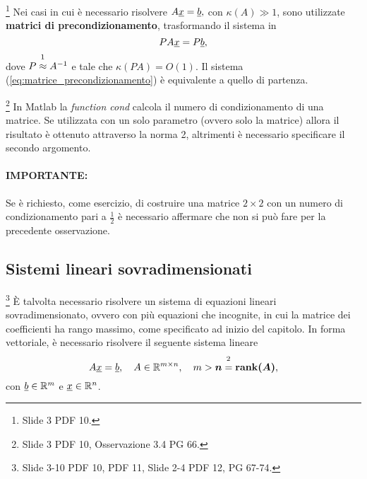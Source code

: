 \begin{remark}\footnote{Slide 3 PDF 10.}
    Nei casi in cui è necessario risolvere $A\uline x = \uline b,$ con $\kappa(A)\gg1$, sono utilizzate \textbf{matrici di precondizionamento}, trasformando il sistema in
    \begin{equation}\label{eq:matrice_precondizionamento}
        PA\uline x= P\uline b,
    \end{equation}
    dove $P\overset{\footnotemark}{\approx} A^{-1}$ e tale che $\kappa(PA)=O(1)$. Il sistema (\ref{eq:matrice_precondizionamento}) è equivalente a quello di partenza.
\end{remark}


\begin{remark}\footnote{Slide 3 PDF 10, Osservazione 3.4 PG 66.}
    In Matlab la \textit{function cond} calcola il numero di condizionamento di una matrice. Se utilizzata con un solo parametro (ovvero solo la matrice) allora il risultato è ottenuto attraverso la norma 2, altrimenti è necessario specificare il secondo argomento.
\end{remark}

\paragraph{IMPORTANTE:} Se è richiesto, come esercizio, di costruire  una matrice $2\times 2$ con un numero di condizionamento pari a $\frac{1}{2}$ è necessario affermare che non si può fare per la precedente osservazione.

\subsection{Sistemi lineari sovradimensionati}\label{ssec:sistemi_lineari_sovradimensionati}
\footnote{Slide 3-10 PDF 10, PDF 11, Slide 2-4 PDF 12, PG 67-74.}
È talvolta necessario risolvere un sistema di equazioni lineari sovradimensionato, ovvero con più equazioni che incognite, in cui la matrice dei coefficienti ha rango massimo, come specificato ad inizio del capitolo. In forma vettoriale, è necessario risolvere il seguente sistema lineare
\begin{equation}\label{eq:sistema_lineare_equazioni_sovradimensionato}
    A\uline x =\uline b,\quad A\in\mathbb R^{m\times n},\quad m>\boldsymbol n\overset{\footnotemark}{=}\boldsymbol{\rank(A)},
\end{equation}
con $\uline b\in\mathbb R^m$ e $\uline x\in\mathbb R^n$.

